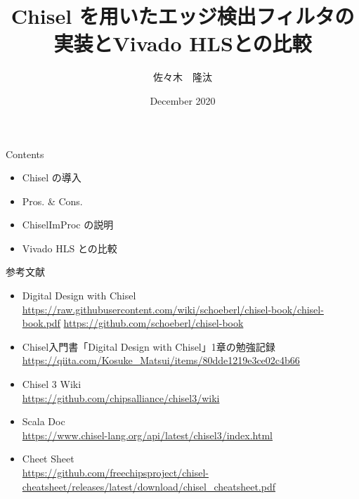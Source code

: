 \documentclass[unicode]{beamer}
\title{Chisel を用いたエッジ検出フィルタの実装とVivado HLSとの比較}
\author{佐々木　隆汰}
\date{December 2020}
\begin{document}
\begin{frame}{}
    \maketitle
\end{frame}

\begin{frame}{Contents}
   \begin{itemize}
       \item Chisel の導入
       \item Pros. \& Cons.
       \item ChiselImProc の説明
       \item Vivado HLS との比較
   \end{itemize} 
\end{frame}








\begin{frame}{参考文献}
    \begin{itemize}
        \item Digital Design with Chisel \\
            \scriptsize{
            \url{https://raw.githubusercontent.com/wiki/schoeberl/chisel-book/chisel-book.pdf}
            \url{https://github.com/schoeberl/chisel-book}
            }
            
        \item Chisel入門書「Digital Design with Chisel」1章の勉強記録 \\
            \scriptsize{
            \url{https://qiita.com/Kosuke_Matsui/items/80dde1219e3ce02c4b66}
            }
            
        \item Chisel 3 Wiki \\
            \scriptsize{
            \url{https://github.com/chipsalliance/chisel3/wiki}
            }
            
        \item Scala Doc \\
            \scriptsize{
            \url{https://www.chisel-lang.org/api/latest/chisel3/index.html}
            }
            
        \item Cheet Sheet \\
            \scriptsize{
            \url{https://github.com/freechipsproject/chisel-cheatsheet/releases/latest/download/chisel_cheatsheet.pdf}
            }
    \end{itemize}
\end{frame}
\end{document}
